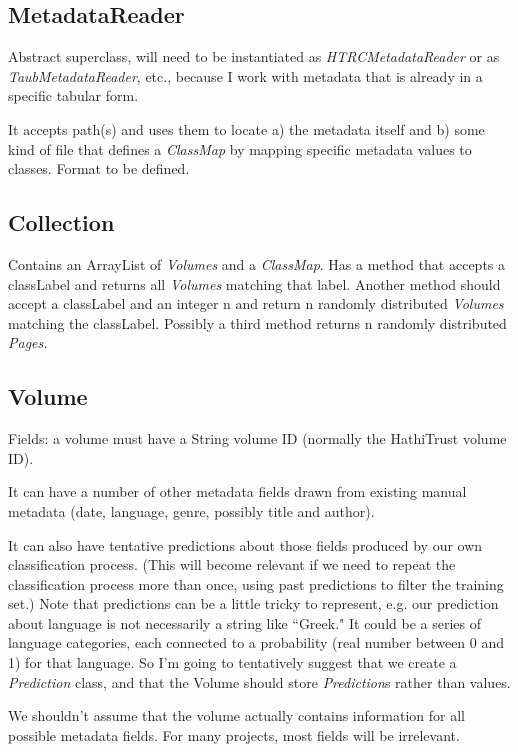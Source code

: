 \documentclass[12pt]{article}
\begin{document}
\subsection{MetadataReader}
Abstract superclass, will need to be instantiated as \emph{HTRCMetadataReader} or as \emph{TaubMetadataReader}, etc., because I work with metadata that is already in a specific tabular form.

It accepts path(s) and uses them to locate a) the metadata itself and b) some kind of file that defines a \emph{ClassMap} by mapping specific metadata values to classes. Format to be defined.

\subsection{Collection}
Contains an ArrayList of \emph{Volumes} and a \emph{ClassMap}. Has a method that accepts a classLabel and returns all \emph{Volumes} matching that label. Another method should accept a classLabel and an integer n and return n randomly distributed \emph{Volumes} matching the classLabel. Possibly a third method returns n randomly distributed \emph{Pages.}

\subsection{Volume}
Fields: a volume must have a String volume ID (normally the HathiTrust volume ID).

It can have a number of other metadata fields drawn from existing manual metadata (date, language, genre, possibly title and author).

It can also have tentative predictions about those fields produced by our own classification process. (This will become relevant if we need to repeat the classification process more than once, using past predictions to filter the training set.) Note that predictions can be a little tricky to represent, e.g. our prediction about language is not necessarily a string like ``Greek." It could be a series of language categories, each connected to a probability (real number between 0 and 1) for that language. So I'm going to tentatively suggest that we create a \emph{Prediction} class, and that the Volume should store \emph{Prediction}s rather than values.

We shouldn't assume that the volume actually contains information for all possible metadata fields. For many projects, most fields will be irrelevant.
\end{document}
